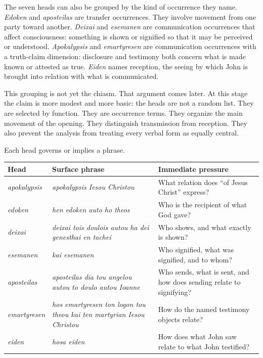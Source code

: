 The seven heads can also be grouped by the kind of occurrence they name. \textit{Edoken} and \textit{aposteilas} are transfer occurrences. They involve movement from one party toward another. \textit{Deixai} and \textit{esemanen} are communication occurrences that affect consciousness: something is shown or signified so that it may be perceived or understood. \textit{Apokalypsis} and \textit{emartyresen} are communication occurrences with a truth-claim dimension: disclosure and testimony both concern what is made known or attested as true. \textit{Eiden} names reception, the seeing by which John is brought into relation with what is communicated.

This grouping is not yet the chiasm. That argument comes later. At this stage the claim is more modest and more basic: the heads are not a random list. They are selected by function. They are occurrence terms. They organize the main movement of the opening. They distinguish transmission from reception. They also prevent the analysis from treating every verbal form as equally central.

Each head governs or implies a phrase.

\begin{center}
\begin{longtable}{@{}L{0.18\textwidth}L{0.36\textwidth}L{0.34\textwidth}@{}}
\toprule
Head & Surface phrase & Immediate pressure \\
\midrule
\textit{apokalypsis} & \textit{apokalypsis Iesou Christou} & What relation does ``of Jesus Christ'' express? \\
\textit{edoken} & \textit{hen edoken auto ho theos} & Who is the recipient of what God gave? \\
\textit{deixai} & \textit{deixai tois doulois autou ha dei genesthai en tachei} & Who shows, and what exactly is shown? \\
\textit{esemanen} & \textit{kai esemanen} & Who signified, what was signified, and to whom? \\
\textit{aposteilas} & \textit{aposteilas dia tou angelou autou to doulo autou Ioanne} & Who sends, what is sent, and how does sending relate to signifying? \\
\textit{emartyresen} & \textit{hos emartyresen ton logon tou theou kai ten martyrian Iesou Christou} & How do the named testimony objects relate? \\
\textit{eiden} & \textit{hosa eiden} & How does what John saw relate to what John testified? \\
\bottomrule
\end{longtable}
\end{center}

